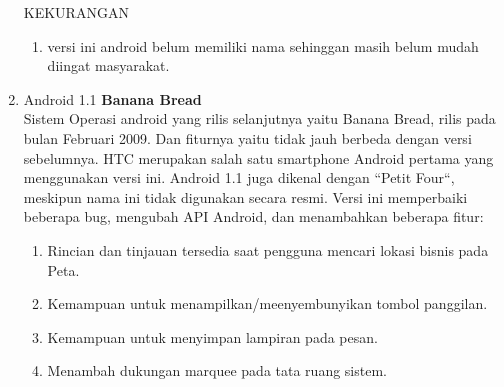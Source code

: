 \begin{enumerate}
KEKURANGAN\\
\begin{enumerate}
    \item versi ini android belum memiliki nama sehinggan masih belum mudah diingat masyarakat.
\end{enumerate}


\item Android 1.1 \textbf{Banana Bread}\\
Sistem Operasi android yang rilis selanjutnya yaitu Banana Bread, rilis pada bulan Februari 2009. Dan fiturnya yaitu tidak jauh berbeda dengan versi sebelumnya. HTC merupakan salah satu smartphone Android pertama yang menggunakan versi ini. Android 1.1 juga dikenal dengan “Petit Four“, meskipun nama ini tidak digunakan secara resmi. Versi ini memperbaiki beberapa bug, mengubah API Android, dan menambahkan beberapa fitur:
\begin{enumerate}
    \item Rincian dan tinjauan tersedia saat pengguna mencari lokasi bisnis pada Peta.
    \item Kemampuan untuk menampilkan/meenyembunyikan tombol panggilan.
    \item Kemampuan untuk menyimpan lampiran pada pesan.
    \item Menambah dukungan marquee pada tata ruang sistem.
\end{enumerate}



\end{enumerate}
